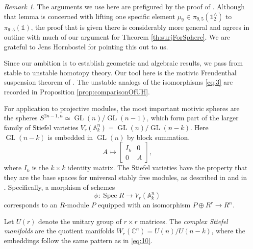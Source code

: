 \documentclass[11pt, oneside, dvipsnames, svgnames, table, final]{amsart}
\newcommand{\mathbx}[1]{\mathbb{#1}}
\theoremstyle{plain}
\theoremstyle{definition}
\theoremstyle{remark}
\newtheorem{remark}[thm]{Remark}
\newcommand{\C}{\mathbx{C}}
\newcommand{\A}{\mathbx{A}}
\newcommand{\Gl}{\operatorname{GL}}
\newcommand{\spec}{\operatorname{Spec}}
\newcommand{\Spec}{\spec}
\newcommand{\weq}{\simeq}
\newcommand{\GL}{\Gl}
\newcommand{\<}[1]{{\langle}#1 {\rangle}}
\newcommand{\one}{\mathbb{1}}
\begin{document}
\begin{remark}\label{rem:Hornbostel}
  The arguments we use here are prefigured by the proof of \cite[Lemma 2.10]{Hornbostel2018}. Although that lemma is concerned with lifting one specific element $\mu_9 \in \pi_{9,5}(\one^\wedge_2)$ to $\pi_{9,5}(\one)$, the proof that is given there is considerably more general and agrees in outline with much of our argument for Theorem \ref{th:surjForSphere}. We are grateful to Jens Hornbostel for pointing this out to us.
\end{remark}

Since our ambition is to establish geometric and algebraic results, we pass from stable to unstable homotopy theory. Our tool here is the motivic Freudenthal suspension theorem of \cite{Asok2024}. The unstable analogs of the isomorphisms \eqref{eq:3} are recorded in Proposition \ref{prop:comparisonOfUH}.

For application to projective modules, the most important motivic spheres are the spheres $S^{2n-1,n} \weq \GL(n)/\GL(n-1)$, which form part of the larger family of Stiefel varieties $V_r(\A^n_k) = \GL(n)/\GL(n-k)$. Here $\GL(n-k)$ is embedded in $\GL(n)$ by block summation.
  \begin{equation}
    \label{eq:10}
    A \mapsto
    \begin{bmatrix}
      I_k & 0 \\ 0 & A
    \end{bmatrix},
  \end{equation}
where $I_k$ is the $k \times k$ identity matrix.
 The Stiefel varieties have the property that they are the base spaces for universal stably free modules, as described in \cite{Raynaud1968a} and in \cite[Sec.~3]{Gant2025}. Specifically, a morphism of schemes
\[ \phi:\Spec R \to V_r(\A_k^n) \]
corresponds to an $R$-module $P$ equipped with an isomorphism $P \oplus R^r \to R^n$. 

Let $U(r)$ denote the unitary group of $r \times r$ matrices. The \emph{complex Stiefel manifolds} are the quotient manifolds $W_r(\C^n) = U(n)/U(n-k)$, where the embeddings follow the same pattern as in \eqref{eq:10}.
\end{document}
